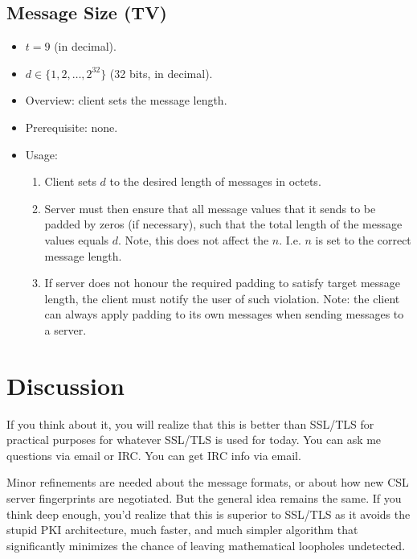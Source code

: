 \documentclass{article}
\begin{document}
\subsection{Message Size (TV)}
\begin{itemize}
    \item $t = 9$ (in decimal).
    \item $d \in \{1,2,\ldots,2^{32}\}$ (32 bits, in decimal).
    \item Overview: client sets the message length.
    \item Prerequisite: none.
    \item Usage:
        \begin{enumerate}
            \item Client sets $d$ to the desired length of messages in octets.
            \item Server must then ensure that all message values that it sends
            to be padded by zeros (if necessary), such that the total length of
            the message values equals $d$. Note, this does not affect the $n$.
            I.e. $n$ is set to the correct message length.
            \item If server does not honour the required padding to satisfy
            target message length, the client must notify the user of such
            violation. Note: the client can always apply padding to its own
            messages when sending messages to a server.
        \end{enumerate}
\end{itemize}

\section{Discussion}
If you think about it, you will realize that this is better than SSL/TLS for
practical purposes for whatever SSL/TLS is used for today. You can ask me
questions via email or IRC. You can get IRC info via email.

Minor refinements are needed about the message formats, or
about how new CSL server fingerprints are negotiated. But the general idea
remains the same. If you think deep enough, you'd realize that this is superior
to SSL/TLS as it avoids the stupid PKI architecture, much faster, and much
simpler algorithm that significantly minimizes the chance of leaving
mathematical loopholes undetected.
\end{document}
